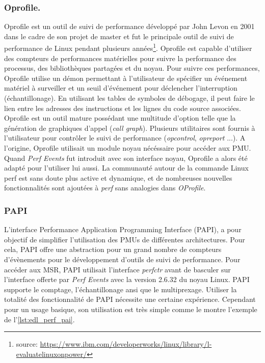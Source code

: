     \subsubsection{Oprofile.} 
        Oprofile \cite{Levon2004} est un outil de suivi de performance développé par John Levon en 2001 dans le cadre de son projet de master et fut le principale outil de suivi de performance de Linux pendant plusieurs années\footnote{source: \url{https://www.ibm.com/developerworks/linux/library/l-evaluatelinuxonpower/}}. 
        Oprofile est capable d'utiliser des compteurs de performances matérielles pour suivre la performance des processus, des bibliothèques partagées et du noyau. Pour suivre ces performances, Oprofile utilise un démon permettant à l'utilisateur de spécifier un événement matériel à surveiller et un seuil d'événement pour déclencher l'interruption (échantillonage). En utilisant les tables de symboles de débogage, il peut faire le lien entre les adresses des instructions et les lignes du code source associées. Oprofile est un outil mature possédant une multitude d'option telle que la génération de graphiques d'appel (\textit{call graph}). Plusieurs utilitaires sont fournis à l'utilisateur pour contrôler le suivi de performance (\textit{opcontrol}, \textit{opreport} ...).
        A l'origine, Oprofile utilisait un module noyau nécéssaire pour accéder aux PMU. Quand \textit{Perf Events} fut introduit avec son interface noyau, Oprofile a alors été adapté pour l'utiliser lui aussi. La communauté autour de la commande Linux perf est sans doute plus active et dynamique, et de nombreuses nouvelles fonctionnalités sont ajoutées à \textit{perf} sans analogies dans \textit{OProfile}.
    
    \subsubsection{PAPI}
    L'interface Performance Application Programming Interface (PAPI), a pour objectif de simplifier l'utilisation des PMUs de différentes architectures. Pour cela, PAPI offre une abstraction pour un grand nombre de compteurs d'évènements pour le développement d'outils de suivi de performance. Pour accéder aux MSR, PAPI utilisait l'interface \textit{perfctr} avant de basculer sur l'interface offerte par \textit{Perf Events} avec la version 2.6.32 du noyau Linux. PAPI supporte le comptage, l'échantillonage ansi que le multiprexage. Utiliser la totalité des fonctionnalité de PAPI nécessite une certaine expérience. Cependant pour un usage basique, son utilisation est très simple comme le montre l'exemple de l'\autoref{lst:edl_perf_pai}.

